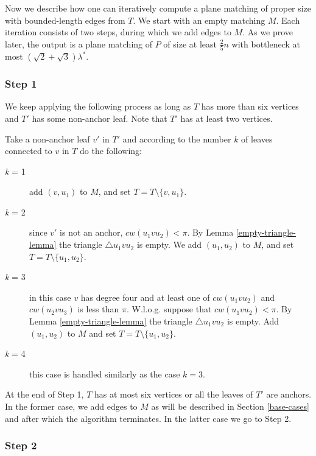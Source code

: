 \documentclass[11pt,a4paper]{article}
\newcommand{\btopt}{\lambda^*}
\newcommand{\cw}{cw}
\begin{document}
Now we describe how one can iteratively compute a plane matching of proper size with bounded-length edges from $T$. We start with an empty matching $M$. Each iteration consists of two steps, during which we add edges to $M$. As we prove later, the output is a plane matching of $P$ of size at least $\frac{2}{5}n$ with bottleneck at most $(\sqrt{2}+\sqrt{3})\btopt$.

\subsubsection{Step 1}

We keep applying the following process as long as $T$ has more than six vertices and $T'$ has some non-anchor leaf. Note that $T'$ has at least two vertices.
 
Take a non-anchor leaf $v'$ in $T'$ and according to the number $k$ of leaves connected to $v$ in $T$ do the following:
 \begin{description}
  \item[{\em k} = 1] add $(v, u_1)$ to $M$, and set $T=T\setminus\{v, u_1\}$. 
  \item[{\em k} = 2] since $v'$ is not an anchor, $\cw(u_1vu_2)< \pi$. By Lemma \ref{empty-triangle-lemma} the triangle $\bigtriangleup u_1vu_2$ is empty. We add $(u_1, u_2)$ to $M$, and set $T=T\setminus\{u_1, u_2\}$.
  \item[{\em k} = 3] in this case $v$ has degree four and at least one of $\cw(u_1vu_2)$ and $\cw(u_2vu_3)$ is less than $\pi$. W.l.o.g. suppose that $\cw(u_1vu_2)< \pi$. By Lemma \ref{empty-triangle-lemma} the triangle $\bigtriangleup u_1vu_2$ is empty. Add $(u_1, u_2)$ to $M$ and set $T=T\setminus\{u_1, u_2\}$. 
  \item[{\em k} = 4] this case is handled similarly as the case $k=3$.
 \end{description}

At the end of Step 1, $T$ has at most six vertices or all the leaves of $T'$ are anchors. In the former case, we add edges to $M$ as will be described in Section \ref{base-cases} and after which the algorithm terminates. In the latter case we go to Step 2.

\subsubsection{Step 2}
\end{document}
